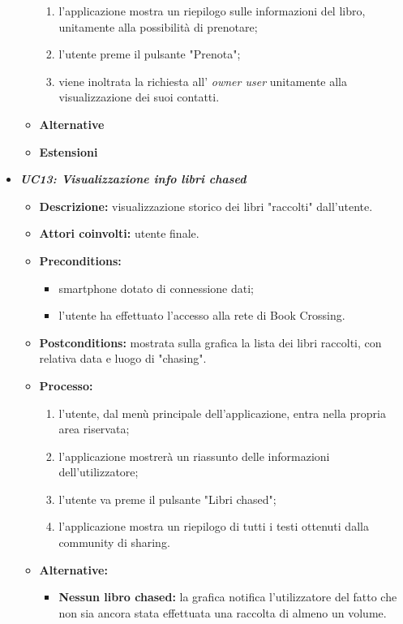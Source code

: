 \begin{itemize}
\begin{itemize}
\begin{enumerate}
			\item l'applicazione mostra un riepilogo sulle informazioni del libro, unitamente alla possibilità di prenotare;
			\item l'utente preme il pulsante "Prenota";
			\item viene inoltrata la richiesta all' \textit{owner user} unitamente alla visualizzazione dei suoi contatti.
		\end{enumerate}
		\item \textbf{Alternative}
		\item \textbf{Estensioni}
	\end{itemize}
	\item \textbf{\textit{UC13: Visualizzazione info libri chased}}
	\begin{itemize}
		\item \textbf{Descrizione:} visualizzazione storico dei libri "raccolti" dall'utente.
		\item \textbf{Attori coinvolti:} utente finale.
		\item \textbf{Preconditions:}
		\begin{itemize}
			\item smartphone dotato di connessione dati;
			\item l’utente ha effettuato l’accesso alla rete di Book Crossing.
		\end{itemize}
		\item \textbf{Postconditions:} mostrata sulla grafica la lista dei libri raccolti, con relativa data e luogo di "chasing".
		\item \textbf{Processo:}
		\begin{enumerate}
			\item l'utente, dal menù principale dell'applicazione, entra nella propria area riservata;
			\item l'applicazione mostrerà un riassunto delle informazioni dell'utilizzatore;
			\item l'utente va preme il pulsante "Libri chased";
			\item l'applicazione mostra un riepilogo di tutti i testi ottenuti dalla community di sharing.
		\end{enumerate}
		\item \textbf{Alternative:}
		\begin{itemize}
			\item \textbf{Nessun libro chased:} la grafica notifica l'utilizzatore del fatto che non sia ancora stata effettuata una raccolta di almeno un volume.
		\end{itemize}

\end{itemize}
\end{itemize}

